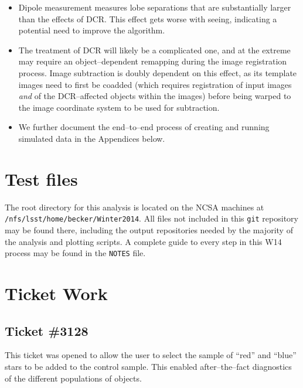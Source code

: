 \documentclass[DM,toc]{lsstdoc}
\begin{document}
\begin{itemize}
\item Dipole measurement measures lobe separations that are
  substantially larger than the effects of DCR.  This effect gets
  worse with seeing, indicating a potential need to improve the
  algorithm.

\item The treatment of DCR will likely be a complicated one, and at
  the extreme may require an object--dependent remapping during the
  image registration process.  Image subtraction is doubly dependent
  on this effect, as its template images need to first be coadded
  (which requires registration of input images {\it and} of the
  DCR--affected objects within the images) before being warped to the
  image coordinate system to be used for subtraction.

\item We further document the end--to--end process of creating and
  running simulated data in the Appendices below.

\end{itemize}



\appendix

\section{Test files}

The root directory for this analysis is located on the NCSA machines
at \\{\tt /nfs/lsst/home/becker/Winter2014}.  All files not included in
this {\tt git} repository may be found there, including the output
repositories needed by the majority of the analysis and plotting
scripts.  A complete guide to every step in this W14 process may be
found in the {\tt NOTES} file.

\section{Ticket Work}

\subsection{Ticket \#3128 \label{sec:3128}}

This ticket was opened to allow the user to select the sample of
``red'' and ``blue'' stars to be added to the control sample.  This
enabled after--the--fact diagnostics of the different populations of
objects.
\end{document}
